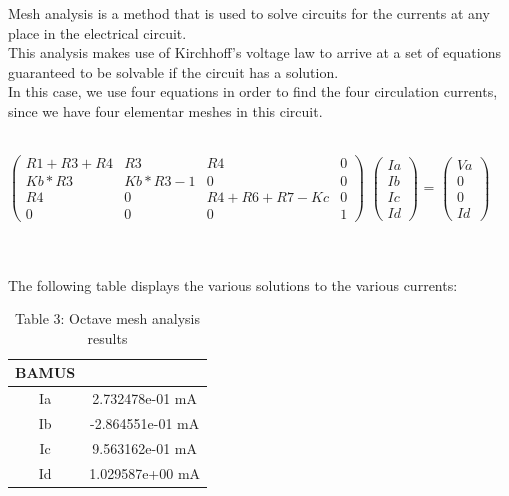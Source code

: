 Mesh analysis is a method that is used to solve circuits for the currents at any place in the electrical circuit.\\
This analysis makes use of Kirchhoff’s voltage law to arrive at a set of equations guaranteed to be solvable if the circuit has a solution.\\In this case, we use four equations in order to find the four circulation currents, since we have four elementar meshes in this circuit.

\\
$\begin{pmatrix}
R1+R3+R4 & R3 & R4 & 0 \\
Kb*R3 & Kb*R3 - 1 & 0 & 0 \\
R4 & 0 & R4+R6+R7-Kc & 0 \\
0 & 0 & 0 & 1 
\end{pmatrix}$
$\begin{pmatrix}
Ia\\
Ib\\
Ic\\
Id
\end{pmatrix}$
=
$\begin{pmatrix}
Va\\
0\\
0\\
Id
\end{pmatrix}$

\\
\\

The following table displays the various solutions to the various currents:

\begin{table}[h]
\centering
\begin{tabular}{c|c} 
 \hline
 BAMUS\\ [0.5ex] 
 \hline\hline
Ia & 2.732478e-01 mA\\ \hline
Ib & -2.864551e-01 mA\\ \hline
Ic & 9.563162e-01 mA\\ \hline
Id & 1.029587e+00 mA\\ \hline 
\end{tabular}
\caption{Table 3: Octave mesh analysis results}
\label{table:3}
\end{table}

















